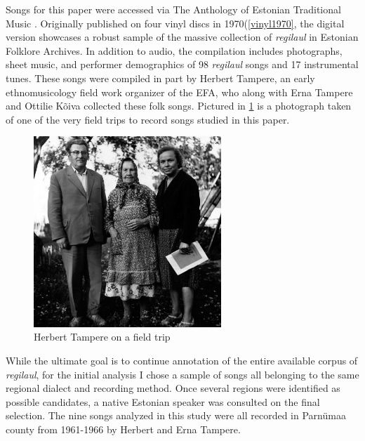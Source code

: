 Songs for this paper were accessed via The Anthology of Estonian Traditional Music \citep{tampereAnthologyEstonianTraditional2016}. Originally published on four vinyl discs in 1970(\ref{vinyl1970}, the digital version showcases a robust sample of the massive collection of {\it regilaul} in Estonian Folklore Archives. In addition to audio, the  compilation includes  photographs, sheet music, and performer demographics of 98 {\it regilaul} songs and 17 instrumental tunes. 
These songs were compiled in part by Herbert Tampere, an early ethnomusicology field work organizer of the EFA, who along with Erna Tampere and Ottilie Kõiva collected these folk songs. Pictured in \ref{tampy} is a photograph taken of one of the very field trips to record songs studied in this paper. 

\begin{figure}[htb]
\centering

\includegraphics[width=200pt]{figures/Mf_07027_Tampered_Orik.jpg}
\caption{Herbert Tampere on a field trip}
\label{tampy}
\end{figure}


While the ultimate goal is to continue annotation of the entire available corpus of {\it regilaul}, for the initial analysis I chose a sample of songs all belonging to the same regional dialect and recording method. Once several regions were identified as possible candidates, a native Estonian speaker was consulted on the final selection. The nine songs analyzed in this study were all recorded in Parnümaa county from 1961-1966 by Herbert and Erna Tampere. 


